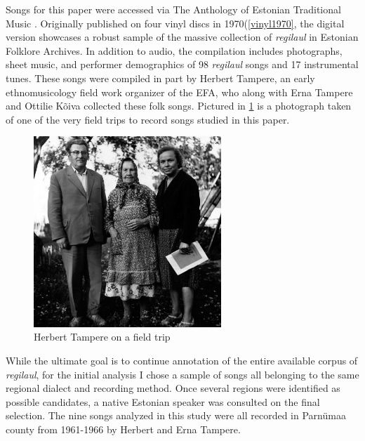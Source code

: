 Songs for this paper were accessed via The Anthology of Estonian Traditional Music \citep{tampereAnthologyEstonianTraditional2016}. Originally published on four vinyl discs in 1970(\ref{vinyl1970}, the digital version showcases a robust sample of the massive collection of {\it regilaul} in Estonian Folklore Archives. In addition to audio, the  compilation includes  photographs, sheet music, and performer demographics of 98 {\it regilaul} songs and 17 instrumental tunes. 
These songs were compiled in part by Herbert Tampere, an early ethnomusicology field work organizer of the EFA, who along with Erna Tampere and Ottilie Kõiva collected these folk songs. Pictured in \ref{tampy} is a photograph taken of one of the very field trips to record songs studied in this paper. 

\begin{figure}[htb]
\centering

\includegraphics[width=200pt]{figures/Mf_07027_Tampered_Orik.jpg}
\caption{Herbert Tampere on a field trip}
\label{tampy}
\end{figure}


While the ultimate goal is to continue annotation of the entire available corpus of {\it regilaul}, for the initial analysis I chose a sample of songs all belonging to the same regional dialect and recording method. Once several regions were identified as possible candidates, a native Estonian speaker was consulted on the final selection. The nine songs analyzed in this study were all recorded in Parnümaa county from 1961-1966 by Herbert and Erna Tampere. 


